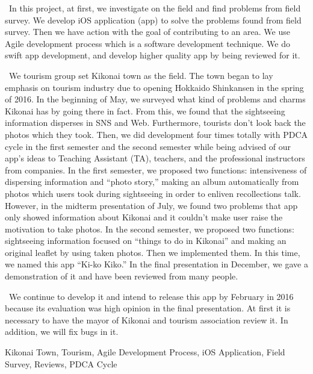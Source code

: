 \begin{eabstract} 

\ In this project, at first, we investigate on the field and find problems from field survey. We develop iOS application (app) to solve the problems found from field survey. Then we have action with the goal of contributing to an area. We use Agile development process which is a software development technique. We do swift app development, and develop higher quality app by being reviewed for it. 

\ We tourism group set Kikonai town as the field. The town began to lay emphasis on tourism industry due to opening Hokkaido Shinkansen in the spring of 2016. In the beginning of May, we surveyed what kind of problems and charms Kikonai has by going there in fact. From this, we found that the sightseeing information disperses in SNS and Web. Furthermore, tourists don't look back the photos which they took. Then, we did development four times totally with PDCA cycle in the first semester and the second semester while being advised of our app's ideas to Teaching Assistant (TA), teachers, and the professional instructors from companies. In the first semester, we proposed two functions: intensiveness of dispersing information and ``photo story,'' making an album automatically from photos which users took during sightseeing in order to enliven recollections talk. However, in the midterm presentation of July, we found two problems that app only showed information about Kikonai and it couldn't make user raise the motivation to take photos. In the second semester, we proposed two functions:  sightseeing information focused on ``things to do in Kikonai'' and making an original leaflet by using taken photos. Then we implemented them. In this time, we named this app ``Ki-ko Kiko.'' In the final presentation in December, we gave a demonstration of it and have been reviewed from many people.

\ We continue to develop it and intend to release this app by February in 2016 because its evaluation was high opinion in the final presentation. At first it is necessary to have the mayor of Kikonai and tourism association review it. In addition, we will fix bugs in it.



\begin{ekeyword}
Kikonai Town, Tourism, Agile Development Process, iOS Application, Field Survey, Reviews, PDCA Cycle
\end{ekeyword}
\end{eabstract}